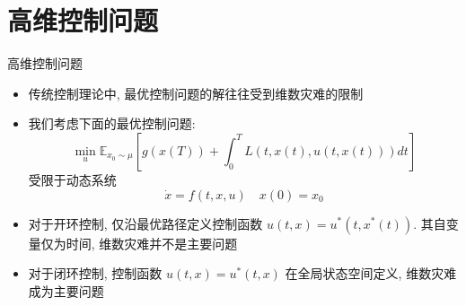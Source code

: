 \documentclass[aspectratio=169]{beamer}
\begin{document}
	\section{高维控制问题}
	\begin{frame}{高维控制问题}
		\begin{itemize}
			\item 传统控制理论中, 最优控制问题的解往往受到维数灾难的限制
			\item 我们考虑下面的最优控制问题:
				\begin{equation*}
					\min_{u} \mathbb{E}_{x_{0}\sim\mu}\left[g\left(x\left(T\right)\right) + \int_{0}^{T} L\left(t, x\left(t\right), u\left(t, x\left(t\right)\right)\right) dt \right]
				\end{equation*}
				受限于动态系统
				\begin{equation*}
					\dot{x} = f\left(t, x, u\right) \quad x\left(0\right) = x_{0}
				\end{equation*}
			\item 对于开环控制, 仅沿最优路径定义控制函数 $u\left(t, x\right) = u^{*}\left(t, x^{*}\left(t\right)\right)$. 其自变量仅为时间, 维数灾难并不是主要问题
			\item 对于闭环控制, 控制函数 $u\left(t, x\right) = u^{*}\left(t, x\right)$ 在全局状态空间定义, 维数灾难成为主要问题
		\end{itemize}
	\end{frame}
\end{document}
